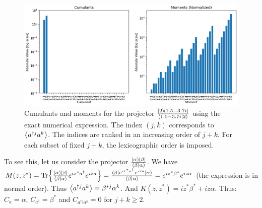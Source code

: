 \begin{center}
    \begin{figure}[h!]
      \centering
      \includegraphics[width=0.9\linewidth]{Pics/PictureProj.pdf}
      \caption{Cumulants and moments for the projector $\frac{\ketbra{2}{1.5-3.7i}}{\braket{1.5-3.7i}{2}}$ using the exact numerical expression. The index $(j, k)$ corresponds to $\left\langle a^{\dagger j} a^k \right\rangle$. The indices are ranked in an increasing order of $j+k$. For each subset of fixed $j+k$, the lexicographic order is imposed.}
      \label{fig:PictureProj}
    \end{figure}
\end{center}

To see this, let us consider the projector $\frac{\ketbra{\alpha}{\beta}}{\braket{\beta}{\alpha}}$. We have $M(z, z^*) = \Tr{\frac{\ketbra{\alpha}{\beta}}{\braket{\beta}{\alpha}} e^{i z^* a^\dagger} e^{i z a}} = \frac{\mel{\beta}{e^{i z^* a^\dagger} e^{i z a}}{\alpha}}{\braket{\beta}{\alpha}} = e^{i z^* \beta^*} e^{i z \alpha}$ (the expression is in normal order). Thus $\left\langle a^{\dagger j} a^k \right\rangle = \beta^{* j} \alpha^k$. And $K(z, z^*) = i z^* \beta^* + i z \alpha$. Thus: $C_{a} = \alpha$, $C_{a^\dagger} = \beta^*$ and $C_{a^{\dagger j} a^k} = 0$ for $j + k \ge 2$.